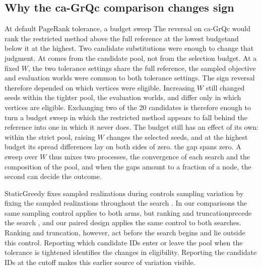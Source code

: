 \documentclass[smallextended]{svjour3}
\providecommand{\DIFaddtex}[1]{{\protect\color{blue} \sf #1}} %
\providecommand{\DIFdeltex}[1]{{\protect\color{red} \scriptsize #1}} %
\providecommand{\DIFaddbegin}{} %
\providecommand{\DIFaddend}{} %
\providecommand{\DIFdelbegin}{} %
\providecommand{\DIFdelend}{} %
\providecommand{\DIFadd}[1]{\texorpdfstring{\DIFaddtex{#1}}{#1}} %
\providecommand{\DIFdel}[1]{\texorpdfstring{\DIFdeltex{#1}}{}} %
\providecommand{\DIFscaledelfig}{0.5}
\newlength{\DIFdelgraphicswidth} %
\newlength{\DIFdelgraphicsheight} %
\providecommand{\DIFaddincludegraphics}[2][]{{\color{blue}\fbox{\DIFOincludegraphics[#1]{#2}}}} %
\providecommand{\DIFdelincludegraphics}[2][]{%
\sbox{\DIFdelgraphicsbox}{\DIFOincludegraphics[#1]{#2}}%
\settoboxwidth{\DIFdelgraphicswidth}{\DIFdelgraphicsbox} %
\settoboxtotalheight{\DIFdelgraphicsheight}{\DIFdelgraphicsbox} %
\scalebox{\DIFscaledelfig}{%
\parbox[b]{\DIFdelgraphicswidth}{\usebox{\DIFdelgraphicsbox}\\[-\baselineskip] \rule{\DIFdelgraphicswidth}{0em}}\llap{\resizebox{\DIFdelgraphicswidth}{\DIFdelgraphicsheight}{%
\setlength{\unitlength}{\DIFdelgraphicswidth}%
\begin{picture}(1,1)%
\thicklines\linethickness{2pt} %
{\color[rgb]{1,0,0}\put(0,0){\framebox(1,1){}}}%
{\color[rgb]{1,0,0}\put(0,0){\line( 1,1){1}}}%
{\color[rgb]{1,0,0}\put(0,1){\line(1,-1){1}}}%
\end{picture}%
}\hspace*{3pt}}} %
} %
\DeclareRobustCommand{\DIFaddbegin}{\DIFOaddbegin \let\includegraphics\DIFaddincludegraphics} %
\DeclareRobustCommand{\DIFaddend}{\DIFOaddend \let\includegraphics\DIFOincludegraphics} %
\DeclareRobustCommand{\DIFdelbegin}{\DIFOdelbegin \let\includegraphics\DIFdelincludegraphics} %
\DeclareRobustCommand{\DIFdelend}{\DIFOaddend \let\includegraphics\DIFOincludegraphics} %
\begin{document}
\subsection{Why the ca-GrQc comparison changes sign}
\DIFdelbegin \DIFdel{At default PageRank tolerance, a budget sweep }\DIFdelend \DIFaddbegin \DIFadd{The reversal }\DIFaddend on ca-GrQc \DIFdelbegin \DIFdel{would rank the restricted method above the full reference at the lowest budgetand below it at the highest. Two candidate substitutions were enough to change that judgment. At }\DIFdelend \DIFaddbegin \DIFadd{comes from the candidate pool, not from the selection budget. At a }\DIFaddend fixed $W$, the \DIFaddbegin \DIFadd{two tolerance settings share the }\DIFaddend full reference, \DIFaddbegin \DIFadd{the }\DIFaddend sampled objective and \DIFdelbegin \DIFdel{evaluation worlds were common to both tolerance settings. The sign reversal therefore depended on which vertices were eligible. Increasing $W$ still changed seeds within the tighter pool, }\DIFdelend \DIFaddbegin \DIFadd{the evaluation worlds, and differ only in which vertices are eligible. Exchanging two of the 20 candidates is therefore enough to turn a budget sweep in which the restricted method appears to fall behind the reference into one in which it never does. The budget still has an effect of its own: within the strict pool, raising $W$ changes the selected seeds, }\DIFaddend and at the highest budget \DIFdelbegin \DIFdel{its spread differences lay on both sides of zero. }\DIFdelend \DIFaddbegin \DIFadd{the gap spans zero. A sweep over $W$ thus mixes two processes, the convergence of each search and the composition of the pool, and when the gaps amount to a fraction of a node, the second can decide the outcome.
}\DIFaddend 

StaticGreedy \DIFdelbegin \DIFdel{fixes sampled realizations during }\DIFdelend \DIFaddbegin \DIFadd{controls sampling variation by fixing the sampled realizations throughout }\DIFaddend the search \cite{ref8}\DIFdelbegin \DIFdel{. In our comparisons the same sampling control applies to both arms, but ranking and truncationprecede the search }\DIFdelend \DIFaddbegin \DIFadd{, and our paired design applies the same control to both searches. Ranking and truncation, however, act before the search begins and lie outside this control. Reporting which candidate IDs enter or leave the pool when the tolerance is tightened identifies the changes in eligibility}\DIFaddend .
\DIFdelbegin \DIFdel{Reporting the candidate IDs at the cutoff makes this earlier source of variation visible.
}\DIFdelend 
\end{document}
